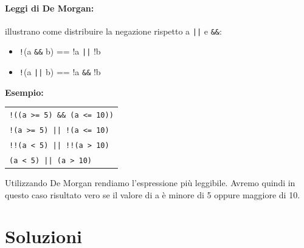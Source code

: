\documentclass[oneside]{scrbook}
\begin{document}
\paragraph{Leggi di De Morgan:} illustrano come distribuire la negazione rispetto a \texttt{||} e \texttt{\&\&}:
\begin{itemize}
    \item \texttt{!}(a \texttt{\&\&} b) == !a \texttt{||} !b
    \item \texttt{!}(a \texttt{||} b) == !a \texttt{\&\&} !b
\end{itemize}

\textbf{Esempio: }
\begin{center}
\begin{tabular}{@{}l@{}}
\texttt{!((a >= 5) \&\& (a <= 10))} \\
\texttt{!(a >= 5) || !(a <= 10)} \quad [De Morgan] \\
\texttt{!!(a < 5) || !!(a > 10)}  \\
\texttt{(a < 5) || (a > 10)} 
\end{tabular}
\end{center}
Utilizzando De Morgan rendiamo l'espressione più leggibile. Avremo quindi in questo caso risultato vero se il valore di a è minore di 5 oppure maggiore di 10.

%  
% 
%  
% 

















% 




\clearpage
\section*{Soluzioni}
\shipoutAnswer
\end{document}
